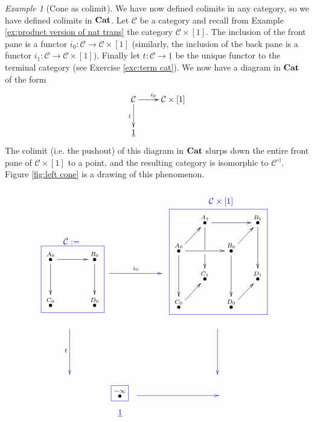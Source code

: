 \documentclass{book}
\newcommand{\cfbox}[2]{
    \colorlet{currentcolor}{.}
    {\color{#1}
    \fbox{\color{currentcolor}#2}}
}
\def\mc{\mathcal}
\newcommand{\boxtitle}[1]{\begin{center}#1\end{center}\vspace{-.1in}}
\def\lcone{^\triangleleft}
\def\to{\rightarrow}
\def\taking{\colon}
\def\ul{\underline}
\newcommand{\LMO}[1]{\stackrel{#1}{\bullet}}
\def\Cat{{\bf Cat}}
\def\mcC{\mc{C}}
\theoremstyle{remark}
\newtheorem{example}[subsubsection]{Example}
\theoremstyle{definition}
\begin{document}
\begin{example}[Cone as colimit]

We have now defined colimits in any category, so we have defined colimits in $\Cat$. Let $\mcC$ be a category and recall from Example \ref{ex:product version of nat trans} the category $\mcC\times[1]$. The inclusion of the front pane is a functor $i_0\taking\mcC\to\mcC\times[1]$ (similarly, the inclusion of the back pane is a functor $i_1\taking\mcC\to\mcC\times[1]$). Finally let $t\taking\mcC\to\ul{1}$ be the unique functor to the terminal category (see Exercise \ref{exc:term cat}). We now have a diagram in $\Cat$ of the form 
$$\xymatrix{\mcC\ar[r]^{i_0}\ar[d]_{t}&\mcC\times[1]\\\ul{1}}$$
The colimit (i.e. the pushout) of this diagram in $\Cat$ slurps down the entire front pane of $\mcC\times[1]$ to a point, and the resulting category is isomorphic to $\mcC\lcone$. Figure \ref{fig:left cone} is a drawing of this phenomenon.
\begin{figure}[H]
$$
\parbox{1in}{~\vspace{.6in}\boxtitle{\color{blue}{$\mcC:=$}}\cfbox{blue}{\parbox{.7in}{\xymatrix@=15pt{
\LMO{A_0}\ar[rr]\ar[dd]&&\LMO{B_0}\ar[dd]\\\\\LMO{C_0}&&\LMO{D_0}
}}}}
\parbox{1.1in}{~\vspace{.6in}\\\xymatrix{~\ar@[blue][rr]^{i_0}&\hspace{.1in}&~}}
\parbox{1.7in}{\boxtitle{\color{blue}{$\mcC\times[1]$}}\cfbox{blue}{\parbox{1.4in}{\xymatrix@=15pt{
&\LMO{A_1}\ar[rr]\ar'[d][dd]&&\LMO{B_1}\ar[dd]\\
\LMO{A_0}\ar[ur]\ar[rr]\ar[dd]&&\LMO{B_0}\ar[ur]\ar[dd]\\
&\LMO{C_1}&&\LMO{D_1}\\
\LMO{C_0}\ar[ur]&&\LMO{D_0}\ar[ur]&
}}}}
$$
$$
\hspace{-.5in}\xymatrix{~\ar@[blue][dd]_t\\\\~}\hspace{2.3in}\xymatrix{~\ar@[blue][dd]\\\\~}
$$
$$
\hspace{.4in}\parbox{.3in}{\cfbox{blue}{$\LMO{-\infty}$}\begin{center}\color{blue}{$\ul{1}$}\end{center}}
\parbox{1.6in}{\xymatrix{~\ar@[blue][rr]&\hspace{.6in}&~}\vspace{.15in}~}
$$
\end{figure}
\end{example}
\end{document}
